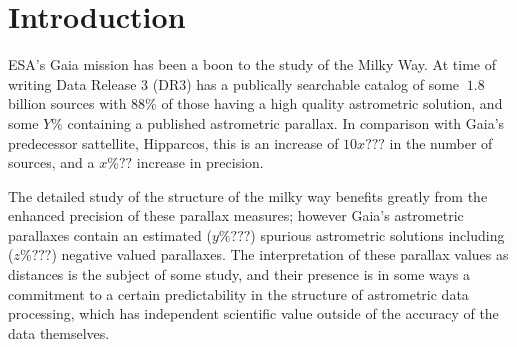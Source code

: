 \documentclass[twocolumn]{aastex631}
\begin{document}

\section{Introduction} \label{sec:intro}

ESA's Gaia mission has been a boon to the study of the Milky Way. At time of writing Data Release 3 (DR3) has a publically searchable catalog of some $~1.8$ billion sources with $88\%$ of those having a high quality astrometric solution, and some $Y\%$ containing a published astrometric parallax. In comparison with Gaia's predecessor sattellite, Hipparcos, this is an increase of $10x???$ in the number of sources, and a $x\%??$ increase in precision.

The detailed study of the structure of the milky way benefits greatly from the enhanced precision of these parallax measures; however Gaia's astrometric parallaxes contain an estimated ($y\%???$) spurious astrometric solutions including ($z\%???$) negative valued parallaxes. The interpretation of these parallax values as distances is the subject of some study, and their presence is in some ways a commitment to a certain predictability in the structure of astrometric data processing, which has independent scientific value outside of the accuracy of the data themselves.
\end{document}
